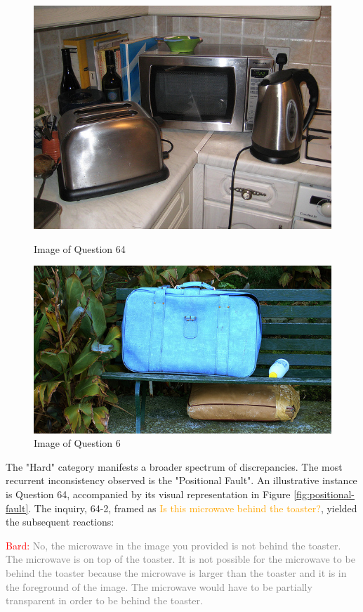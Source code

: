 \documentclass[twocolumn,11pt]{report}
\begin{document}
\begin{figure}[h]
    \centering
    \begin{minipage}{0.8\linewidth}
        \centering
        \includegraphics[width=0.8\linewidth]{../image set/hard/000000256309.jpg}
        \caption{Image of Question 64}
        \label{fig:positional-fault}
    \end{minipage}\par
    \begin{minipage}{0.8\linewidth}
      \centering
      \includegraphics[width=0.8\linewidth]{../image set/easy/000000037024.jpg}
      \caption{Image of Question 6}
      \label{fig:vertical-fault}
    \end{minipage}
\end{figure}

The "Hard" category manifests a broader spectrum of discrepancies. The most recurrent inconsistency observed is the "Positional Fault". An illustrative instance is Question 64, accompanied by its visual representation in Figure \ref{fig:positional-fault}. The inquiry, 64-2, framed as \textcolor{orange}{Is this microwave behind the toaster?}, yielded the subsequent reactions:

\textcolor{red}{Bard:} \textcolor{gray}{No, the microwave in the image you provided is not behind the toaster. The microwave is on top of the toaster. It is not possible for the microwave to be behind the toaster because the microwave is larger than the toaster and it is in the foreground of the image. The microwave would have to be partially transparent in order to be behind the toaster.}
\end{document}
